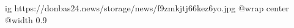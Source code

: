  
 
 
 
 

\ifcmt
  ig https://donbas24.news/storage/news/f9zmkjtj66kez6yo.jpg
  @wrap center
  @width 0.9
\fi
